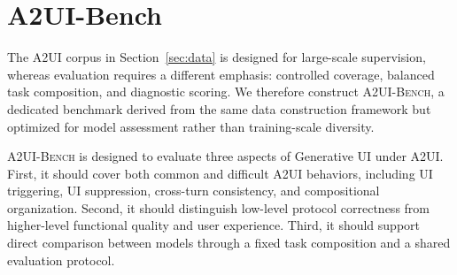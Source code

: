 \documentclass{llmxive}
\begin{document}






\section{A2UI-Bench}
\label{sec:benchmark}


The A2UI corpus in Section~\ref{sec:data} is designed for large-scale supervision, whereas evaluation requires a different emphasis: controlled coverage, balanced task composition, and diagnostic scoring. We therefore construct \textsc{A2UI-Bench}, a dedicated benchmark derived from the same data construction framework but optimized for model assessment rather than training-scale diversity.

\textsc{A2UI-Bench} is designed to evaluate three aspects of Generative UI under A2UI. First, it should cover both common and difficult A2UI behaviors, including UI triggering, UI suppression, cross-turn consistency, and compositional organization. Second, it should distinguish low-level protocol correctness from higher-level functional quality and user experience. Third, it should support direct comparison between models through a fixed task composition and a shared evaluation protocol.
\end{document}
